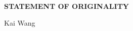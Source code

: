 \thispagestyle{empty}
%
\hfill \rule{0cm}{4cm} \parbox{10cm}{
{\bf STATEMENT OF ORIGINALITY}


}
%
\vspace{2cm}
%
\begin{flushright} Kai Wang \end{flushright}
%
\vfill
\pagebreak
%
\thispagestyle{empty}
%
\cleardoublepage


